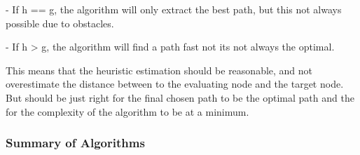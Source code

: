   - If h == g, the algorithm will only extract the best path, but this not always possible due to obstacles.

  - If h > g, the algorithm will find a path fast not its not always the optimal.

  This means that the heuristic estimation should be reasonable, and not overestimate the distance between to the evaluating node and the target node. But should be just right for the final chosen path to be the optimal path and the for the complexity of the algorithm to be at a minimum.

  \subsubsection{Summary of Algorithms}

